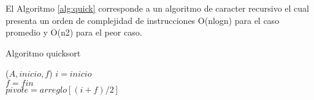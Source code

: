 \documentclass{memoria}
\begin{document}
El Algoritmo \ref{alg:quick} corresponde a un algoritmo de caracter recursivo el cual presenta un orden de complejidad de instrucciones O(nlogn) para el caso promedio y O(n2) para el peor caso.\cite{quicksort_page}\cite{quicksort_video}

\begin{algorithm}
\caption{Algoritmo quicksort}\label{alg:quick}
\quicksort($A,inicio,f$)
$i = inicio$\\
$f = fin$\\
$pivote = arreglo[(i+f)/2]$\\
\end{algorithm}
\end{document}

